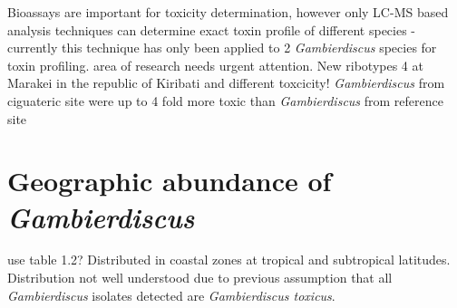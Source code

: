 Bioassays are important for toxicity determination, however only LC-MS based analysis techniques can determine exact toxin profile of different species - currently this technique has only been applied to 2 \emph{Gambierdiscus} species for toxin profiling. area of research needs urgent attention.
New ribotypes 4  at Marakei in the republic of Kiribati and different toxcicity! \emph{Gambierdiscus} from ciguateric site were up to 4 \- fold more toxic than \emph{Gambierdiscus} from reference site \cite{xu2014distribution}

\section{Geographic abundance of \emph{Gambierdiscus}}
use table 1.2?
Distributed in coastal zones at tropical and subtropical latitudes.
Distribution not well understood due to previous assumption that all \emph{Gambierdiscus} isolates detected are \emph{Gambierdiscus toxicus}.

